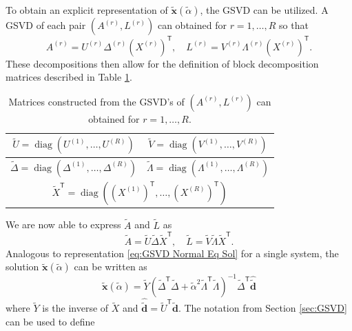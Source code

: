 \documentclass[12pt]{article}
\newcommand{\dVec}{\mathbf{d}}	%
\newcommand{\xVec}{\mathbf{x}}	%
\newcommand{\trans}[1]{{#1}^\mathsf{T}}	%
\newcommand{\inv}[1]{{#1}^{-1}}	%
\DeclareMathOperator{\diag}{diag}	%
\newcommand{\regparam}{\alpha}  %
\newcommand{\regparamBig}{\widetilde{\regparam}}   %
\newcommand{\xBig}{\widetilde{\xVec}}	%
\newcommand{\dBig}{\widetilde{\dVec}}	%
\newcommand{\ABig}{\widetilde{A}}	%
\newcommand{\LBig}{\widetilde{L}}	%
\newcommand{\svd}[1]{\widehat{#1}}	%
\begin{document}
To obtain an explicit representation of $\xBig(\regparamBig)$, the GSVD can be utilized. A GSVD of each pair $(A^{(r)},L^{(r)})$ can obtained for $r = 1,\ldots,R$ so that
\begin{equation}
\label{eq:Mulitple GSVD}
    A^{(r)} = U^{(r)}\Delta^{(r)}\trans{\left(X^{(r)}\right)}, \quad L^{(r)} = V^{(r)}\Lambda^{(r)}\trans{\left(X^{(r)}\right)}.
\end{equation}
These decompositions then allow for the definition of block decomposition matrices described in Table \ref{tab:Block GSVD Matrices}.
\begin{table}[ht!]
  \begin{center}
    \caption{Matrices constructed from the GSVD's of $(A^{(r)},L^{(r)})$ can obtained for $r = 1,\ldots,R$.}
    \label{tab:Block GSVD Matrices}
    \begin{tabular}{|c|c|}
    \hline
    $\widetilde{U} = \diag\left(U^{(1)},\ldots,U^{(R)}\right)$ & $\widetilde{V} = \diag\left(V^{(1)},\ldots,V^{(R)}\right)$ \\
    \hline
    $\widetilde{\Delta} = \diag\left(\Delta^{(1)},\ldots,\Delta^{(R)}\right)$ & $\widetilde{\Lambda} = \diag\left(\Lambda^{(1)},\ldots,\Lambda^{(R)}\right)$ \\
    \hline
    \multicolumn{2}{|c|}{$\trans{\widetilde{X}} = \diag\left(\trans{\left(X^{(1)}\right)},\ldots,\trans{\left(X^{(R)}\right)}\right)$} \\
    \hline
    \end{tabular}
  \end{center}
\end{table}
We are now able to express $\ABig$ and $\LBig$ as
\begin{equation}
    \label{eq:Adapted A and L GSVD}
    \ABig = \widetilde{U}\widetilde{\Delta}\trans{\widetilde{X}}, \quad \LBig = \widetilde{V}\widetilde{\Lambda}\trans{\widetilde{X}}.
\end{equation}
Analogous to representation \eqref{eq:GSVD Normal Eq Sol} for a single system, the solution $\xBig(\regparamBig)$ can be written as 
\begin{equation}
    \label{eq:GSVD Big Normal Eq Sol}
    \xBig(\regparamBig) = \widetilde{Y}\inv{\left(\trans{\widetilde{\Delta}}\widetilde{\Delta} + \widetilde{\regparam}^2 \trans{\widetilde{\Lambda}}\widetilde{\Lambda}\right)}\trans{\widetilde{\Delta}}\svd{\dBig}
\end{equation}
where $\widetilde{Y}$ is the inverse of $\widetilde{X}$ and $\svd{\dBig} = \trans{\widetilde{U}}\dBig$. The notation from Section \ref{sec:GSVD} can be used to define
\end{document}
